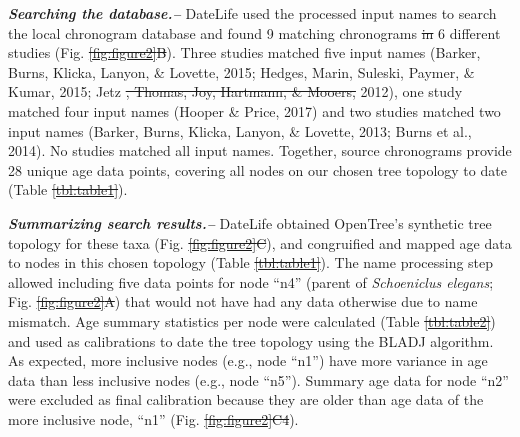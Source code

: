 \documentclass[english,man]{apa6}
\providecommand{\DIFaddtex}[1]{{\protect\color{blue}\uwave{#1}}} %
\providecommand{\DIFdeltex}[1]{{\protect\color{red}\sout{#1}}}                      %
\providecommand{\DIFaddbegin}{} %
\providecommand{\DIFaddend}{} %
\providecommand{\DIFdelbegin}{} %
\providecommand{\DIFdelend}{} %
\providecommand{\DIFadd}[1]{\texorpdfstring{\DIFaddtex{#1}}{#1}} %
\providecommand{\DIFdel}[1]{\texorpdfstring{\DIFdeltex{#1}}{}} %
\newcommand{\DIFscaledelfig}{0.5}
\newlength{\DIFdelgraphicswidth} %
\newlength{\DIFdelgraphicsheight} %
\newcommand{\DIFaddincludegraphics}[2][]{{\color{blue}\fbox{\DIFOincludegraphics[#1]{#2}}}} %
\newcommand{\DIFdelincludegraphics}[2][]{%
\sbox{\DIFdelgraphicsbox}{\DIFOincludegraphics[#1]{#2}}%
\settoboxwidth{\DIFdelgraphicswidth}{\DIFdelgraphicsbox} %
\settoboxtotalheight{\DIFdelgraphicsheight}{\DIFdelgraphicsbox} %
\scalebox{\DIFscaledelfig}{%
\parbox[b]{\DIFdelgraphicswidth}{\usebox{\DIFdelgraphicsbox}\\[-\baselineskip] \rule{\DIFdelgraphicswidth}{0em}}\llap{\resizebox{\DIFdelgraphicswidth}{\DIFdelgraphicsheight}{%
\setlength{\unitlength}{\DIFdelgraphicswidth}%
\begin{picture}(1,1)%
\thicklines\linethickness{2pt} %
{\color[rgb]{1,0,0}\put(0,0){\framebox(1,1){}}}%
{\color[rgb]{1,0,0}\put(0,0){\line( 1,1){1}}}%
{\color[rgb]{1,0,0}\put(0,1){\line(1,-1){1}}}%
\end{picture}%
}\hspace*{3pt}}} %
} %
\DeclareRobustCommand{\DIFaddbegin}{\DIFOaddbegin \let\includegraphics\DIFaddincludegraphics} %
\DeclareRobustCommand{\DIFaddend}{\DIFOaddend \let\includegraphics\DIFOincludegraphics} %
\DeclareRobustCommand{\DIFdelbegin}{\DIFOdelbegin \let\includegraphics\DIFdelincludegraphics} %
\DeclareRobustCommand{\DIFdelend}{\DIFOaddend \let\includegraphics\DIFOincludegraphics} %
\begin{document}
\DIFdelend \textbf{\emph{Searching the database.--}}
DateLife used the processed input names to search the local chronogram database and found 9 matching chronograms \DIFdelbegin \DIFdel{in }\DIFdelend \DIFaddbegin \DIFadd{from }\DIFaddend 6 different studies (Fig. \DIFdelbegin \DIFdel{\ref{fig:figure2}B}\DIFdelend \DIFaddbegin \DIFadd{3B}\DIFaddend ). Three studies matched five input names (Barker, Burns, Klicka, Lanyon, \& Lovette, 2015; Hedges, Marin, Suleski, Paymer, \& Kumar, 2015; Jetz \DIFdelbegin \DIFdel{, Thomas, Joy, Hartmann, \& Mooers, }\DIFdelend \DIFaddbegin \DIFadd{et al., }\DIFaddend 2012), one study matched four input names (Hooper \& Price, 2017) and two studies matched two input names (Barker, Burns, Klicka, Lanyon, \& Lovette, 2013; Burns et al., 2014). No studies matched all input names. Together, source chronograms provide 28 unique age data points, covering all nodes on our chosen tree topology to date (Table \DIFdelbegin \DIFdel{\ref{tbl:table1}}\DIFdelend \DIFaddbegin \DIFadd{1}\DIFaddend ).

\DIFdelbegin %

\DIFdelend \textbf{\emph{Summarizing search results.--}}
DateLife obtained OpenTree's synthetic tree topology for these taxa (Fig. \DIFdelbegin \DIFdel{\ref{fig:figure2}C}\DIFdelend \DIFaddbegin \DIFadd{3C}\DIFaddend ), and congruified and mapped age data to nodes in this chosen topology (Table \DIFdelbegin \DIFdel{\ref{tbl:table1}}\DIFdelend \DIFaddbegin \DIFadd{1}\DIFaddend ).
The name processing step allowed including five data points for node \enquote{n4} (parent of \emph{Schoeniclus elegans}; Fig. \DIFdelbegin \DIFdel{\ref{fig:figure2}A}\DIFdelend \DIFaddbegin \DIFadd{3A}\DIFaddend ) that would not have had any data otherwise due to name mismatch.
Age summary statistics per node were calculated (Table \DIFdelbegin \DIFdel{\ref{tbl:table2}}\DIFdelend \DIFaddbegin \DIFadd{2}\DIFaddend ) and used as calibrations to date the tree topology using the BLADJ algorithm.
As expected, more inclusive nodes (e.g., node \enquote{n1}) have more variance in age data than less inclusive nodes (e.g., node \enquote{n5}).
Summary age data for node \enquote{n2} were excluded as final calibration because they are older than age data of the more inclusive node, \enquote{n1} (Fig. \DIFdelbegin \DIFdel{\ref{fig:figure2}C4}\DIFdelend \DIFaddbegin \DIFadd{3C4}\DIFaddend ).

\newpage
\end{document}
